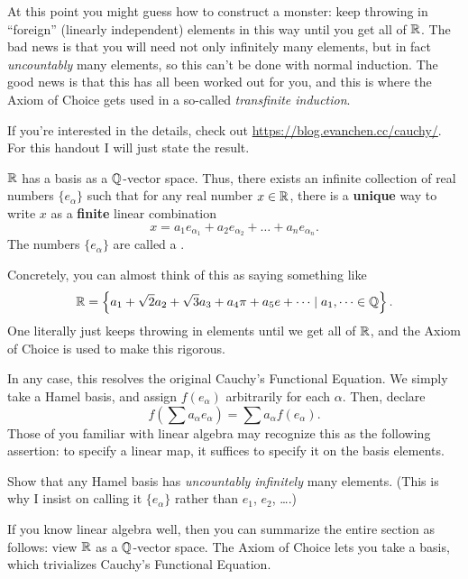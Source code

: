 \documentclass[11pt]{scrartcl}
\begin{document}
At this point you might guess how to construct a monster:
keep throwing in ``foreign'' (linearly independent) elements
in this way until you get all of $\mathbb R$.
The bad news is that you will need not only infinitely many elements,
but in fact \emph{uncountably} many elements, so this can't be done with normal induction.
The good news is that this has all been worked out for you,
and this is where the Axiom of Choice gets used in a so-called \emph{transfinite induction}.

If you're interested in the details, check out
\url{https://blog.evanchen.cc/cauchy/}.
For this handout I will just state the result.

\begin{proposition}
  $\mathbb R$ has a basis as a $\mathbb Q$-vector space.
  Thus, there exists an infinite collection of real numbers
  $\{e_\alpha\}$ such that for any real number $x \in \mathbb R$,
  there is a \textbf{unique} way to write $x$ as a
  \textbf{finite} linear combination
  \[ x = a_1e_{\alpha_1} + a_2e_{\alpha_2} + \dots + a_n e_{\alpha_n}. \]
  The numbers $\{e_\alpha\}$ are called a .
\end{proposition}
Concretely, you can almost think of this as saying something like
\[ \mathbb R = \left\{ a_1 + \sqrt2 a_2 + \sqrt3 a_3 + a_4\pi + a_5e + \dots
  \mid a_1, \dots \in \mathbb Q \right\}. \]
One literally just keeps throwing in elements until we get all of $\mathbb R$,
and the Axiom of Choice is used to make this rigorous.

In any case, this resolves the original Cauchy's Functional Equation.
We simply take a Hamel basis, and assign $f(e_\alpha)$ arbitrarily for each $\alpha$.
Then, declare
\[ \boxed{f\left(\sum a_\alpha e_\alpha \right) = \sum a_\alpha f(e_\alpha)}. \]
Those of you familiar with linear algebra may recognize this as the following assertion:
to specify a linear map, it suffices to specify it on the basis elements.

\begin{exercise}
  Show that any Hamel basis has \emph{uncountably infinitely} many elements.
  (This is why I insist on calling it $\{e_\alpha\}$ rather than $e_1$, $e_2$, \dots.)
\end{exercise}

If you know linear algebra well,
then you can summarize the entire section as follows:
view $\mathbb R$ as a $\mathbb Q$-vector space.
The Axiom of Choice lets you take a basis, which trivializes Cauchy's Functional Equation.
\end{document}

